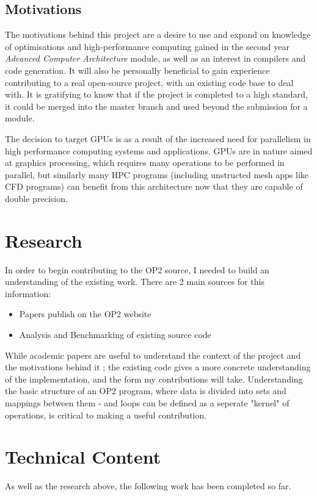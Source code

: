 \documentclass[11pt]{article}
\begin{document}
\subsection*{Motivations}
The motivations behind this project are a desire to use and expand on knowledge of optimisations and high-performance computing gained in the second year \textit{Advanced Computer Architecture} module, as well as an interest in compilers and code generation. It will also be personally beneficial to gain experience contributing to a real open-source project, with an existing code base to deal with. It is gratifying to know that if the project is completed to a high standard, it could be merged into the master branch and used beyond the submission for a module.
\par The decision to target GPUs is as a result of the increased need for parallelism in high performance computing systems and applications. GPUs are in nature aimed at graphics processing, which requires many operations to be performed in parallel, but similarly many HPC programs (including unstructed mesh apps like CFD programs) can benefit from this architecture now that they are capable of double precision.
\clearpage
\section*{Research}
In order to begin contributing to the OP2 source, I needed to build an understanding of the existing work. There are 2 main sources for this information:
\begin{itemize}
 \item{Papers publish on the OP2 website}
 \item{Analysis and Benchmarking of existing source code}
\end{itemize}
While academic papers are useful to understand the context of the project and the motivations behind it \cite{op2main} \cite{autoVector} \cite{industrial}; the existing code gives a more concrete understanding of the implementation, and the form my contributions will take. Understanding the basic structure of an OP2 program, where data is divided into sets and mappings between them - and loops can be defined as a seperate "kernel" of operations, is critical to making a useful contribution. 
\section*{Technical Content}
As well as the research above, the following work has been completed so far.
\end{document}

